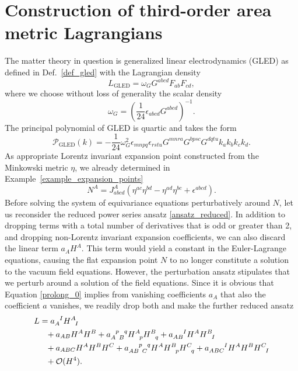 \section{Construction of third-order area metric Lagrangians}\label{section_area_construction}
The matter theory in question is generalized linear electrodynamics (GLED) as defined in Def.~\ref{def_gled} with the Lagrangian density
\begin{equation*}
  L_\text{GLED} = \omega_G G^{abcd} F_{ab} F_{cd},
\end{equation*}
where we choose without loss of generality the scalar density
\begin{equation}\label{area_density}
  \omega_G = \left(\frac{1}{24}\epsilon_{abcd}G^{abcd}\right)^{-1}.
\end{equation}
The principal polynomial of GLED is quartic and takes the form
\begin{equation}
  \mathcal P_\text{GLED}(k) = -\frac{1}{24} \omega_G^2 \epsilon_{mnpq} \epsilon_{rstu} G^{mnra} G^{bpsc} G^{dqtu} k_a k_b k_c k_d.
\end{equation}
As appropriate Lorentz invariant expansion point constructed from the Minkowski metric $\eta$, we already determined in Example~\ref{example_expansion_points}
\begin{equation}\label{area_expansion_point}
  N^A = J_{abcd}^A (\eta^{ac} \eta^{bd} - \eta^{ad} \eta^{bc} + \epsilon^{abcd}).
\end{equation}
Before solving the system of equivariance equations perturbatively around $N$, let us reconsider the reduced power series ansatz \eqref{ansatz_reduced}. In addition to dropping terms with a total number of derivatives that is odd or greater than 2, and dropping non-Lorentz invariant expansion coefficients, we can also discard the linear term $a_A H^A$. This term would yield a constant in the Euler-Lagrange equations, causing the flat expansion point $N$ to no longer constitute a solution to the vacuum field equations. However, the perturbation ansatz stipulates that we perturb around a solution of the field equations. Since it is obvious that Equation \eqref{prolong_0} implies from vanishing coefficients $a_A$ that also the coefficient $a$ vanishes, we readily drop both and make the further reduced ansatz
\begin{equation}\label{ansatz_area_gravity}
  \begin{aligned}
    L &{} = a_A^{\hphantom AI} H^A_{\hphantom AI} \\
      &{} \hphantom{=} + a_{AB} H^A H^B + a_{A\hphantom pB}^{\hphantom Ap\hphantom Bq} H^A_{\hphantom Ap} H^B_{\hphantom Bq} + a_{AB}^{\hphantom{AB}I} H^A H^B_{\hphantom BI} \\
      &{} \hphantom{=} + a_{ABC} H^A H^B H^C + a_{AB\hphantom pC}^{\hphantom{AB}p\hphantom Cq} H^A H^B_{\hphantom Bp} H^C_{\hphantom Cq} + a_{ABC}^{\hphantom{ABC}I} H^A H^B H^C_{\hphantom CI} \\
      &{} \hphantom{=} + \mathcal O(H^4).
  \end{aligned}
\end{equation}

